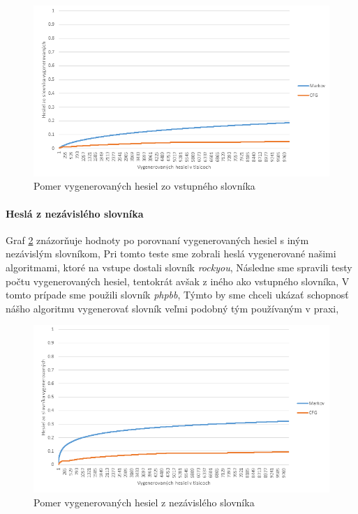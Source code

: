 \begin{figure}[ht]
    \centering
    \includegraphics[width=1\textwidth]{sameDictAcc}
    \caption{Pomer vygenerovaných hesiel zo vstupného slovníka}
    \label{fig:sameDictAcc}
\end{figure}

\paragraph{Heslá z nezávislého slovníka}
Graf \ref{fig:otherDictAcc} znázorňuje hodnoty po porovnaní vygenerovaných hesiel s iným nezávislým slovníkom, Pri tomto teste sme zobrali heslá vygenerované našimi algoritmami, ktoré na vstupe dostali slovník \emph{rockyou}, Následne sme spravili testy počtu vygenerovaných hesiel, tentokrát avšak z iného ako vstupného slovníka, V tomto prípade sme použili slovník \emph{phpbb}, Týmto by sme chceli ukázať schopnosť nášho algoritmu vygenerovať slovník veľmi podobný tým používaným v praxi,

\begin{figure}[ht]
    \centering
    \includegraphics[width=1\textwidth]{otherDictAcc}
    \caption{Pomer vygenerovaných hesiel z nezávislého slovníka}
    \label{fig:otherDictAcc}
\end{figure}

